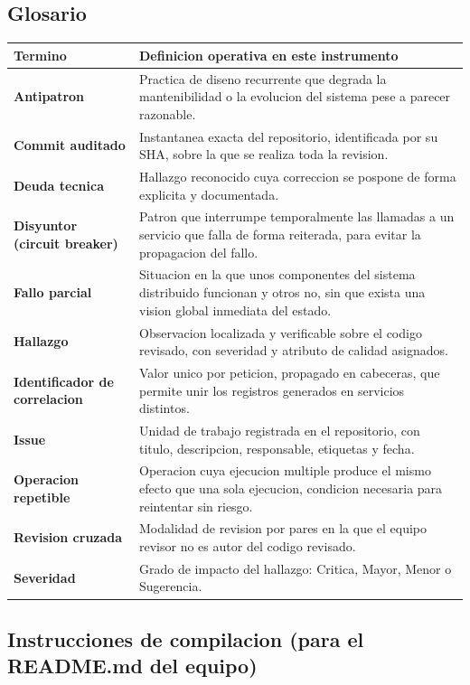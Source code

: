 \documentclass[11pt,a4paper]{article}
\begin{document}
\subsection{Glosario}

\noindent
\begin{tabularx}{\linewidth}{@{}>{\bfseries}p{4.0cm} X@{}}
    \toprule
    \rowcolor{uteqSoft}\textbf{\color{uteqBlue}Termino} & \textbf{\color{uteqBlue}Definicion operativa en este instrumento} \\
    \midrule
    Antipatron & Practica de diseno recurrente que degrada la mantenibilidad o la evolucion del sistema pese a parecer razonable. \\
    Commit auditado & Instantanea exacta del repositorio, identificada por su SHA, sobre la que se realiza toda la revision. \\
    Deuda tecnica & Hallazgo reconocido cuya correccion se pospone de forma explicita y documentada. \\
    Disyuntor (circuit breaker) & Patron que interrumpe temporalmente las llamadas a un servicio que falla de forma reiterada, para evitar la propagacion del fallo. \\
    Fallo parcial & Situacion en la que unos componentes del sistema distribuido funcionan y otros no, sin que exista una vision global inmediata del estado. \\
    Hallazgo & Observacion localizada y verificable sobre el codigo revisado, con severidad y atributo de calidad asignados. \\
    Identificador de correlacion & Valor unico por peticion, propagado en cabeceras, que permite unir los registros generados en servicios distintos. \\
    Issue & Unidad de trabajo registrada en el repositorio, con titulo, descripcion, responsable, etiquetas y fecha. \\
    Operacion repetible & Operacion cuya ejecucion multiple produce el mismo efecto que una sola ejecucion, condicion necesaria para reintentar sin riesgo. \\
    Revision cruzada & Modalidad de revision por pares en la que el equipo revisor no es autor del codigo revisado. \\
    Severidad & Grado de impacto del hallazgo: Critica, Mayor, Menor o Sugerencia. \\
    \bottomrule
\end{tabularx}

\subsection{Instrucciones de compilacion (para el README.md del equipo)}
\end{document}
